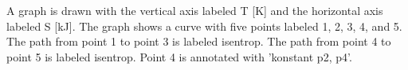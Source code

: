A graph is drawn with the vertical axis labeled T [K] and the horizontal axis labeled S [kJ]. The graph shows a curve with five points labeled 1, 2, 3, 4, and 5. The path from point 1 to point 3 is labeled isentrop. The path from point 4 to point 5 is labeled isentrop. Point 4 is annotated with 'konstant p2, p4'.